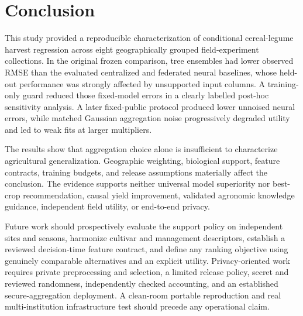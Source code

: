 \documentclass[journal]{IEEEtran}
\begin{document}
\section{Conclusion}

This study provided a reproducible characterization of conditional cereal-legume
harvest regression across eight geographically grouped field-experiment
collections. In the original frozen comparison, tree ensembles had lower
observed RMSE than the evaluated centralized and federated neural baselines,
whose held-out performance was strongly affected by unsupported input columns. A
training-only guard reduced those fixed-model errors in a clearly labelled
post-hoc sensitivity analysis. A later fixed-public protocol produced lower
unnoised neural errors, while matched Gaussian aggregation noise progressively
degraded utility and led to weak fits at larger multipliers.

The results show that aggregation choice alone is insufficient to characterize
agricultural generalization. Geographic weighting, biological support, feature
contracts, training budgets, and release assumptions materially affect the
conclusion. The evidence supports neither universal model superiority nor
best-crop recommendation, causal yield improvement, validated agronomic
knowledge guidance, independent field utility, or end-to-end privacy.

Future work should prospectively evaluate the support policy on independent
sites and seasons, harmonize cultivar and management descriptors, establish a
reviewed decision-time feature contract, and define any ranking objective using
genuinely comparable alternatives and an explicit utility. Privacy-oriented work
requires private preprocessing and selection, a limited release policy, secret
and reviewed randomness, independently checked accounting, and an established
secure-aggregation deployment. A clean-room portable reproduction and real
multi-institution infrastructure test should precede any operational claim.
\end{document}
